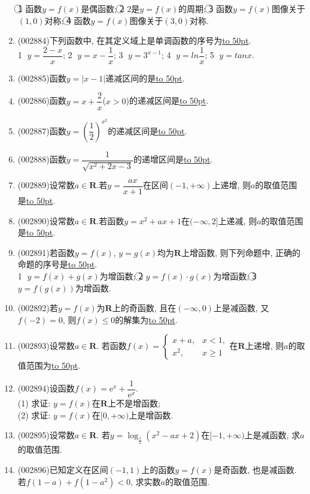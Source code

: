 \documentclass[10pt,a4paper]{article}
\newcommand{\blank}[1]{\underline{\hbox to #1pt{}}}
\begin{document}
\begin{enumerate}[1.]
\textcircled{1} 函数$y=f(x)$是偶函数; \textcircled{2} $2$是$y=f(x)$的周期; \textcircled{3} 函数$y=f(x)$图像关于$(1,0)$对称; \textcircled{4} 函数$y=f(x)$图像关于$(3,0)$对称.
\item {\tiny (002884)}下列函数中, 在其定义域上是单调函数的序号为\blank{50}.\\
\textcircled{1} $y=\dfrac{2-x}x$; \textcircled{2} $y=x-\dfrac 1x$; \textcircled{3} $y={3^{x-1}}$; \textcircled{4} $y=ln\dfrac 1x$; \textcircled{5} $y=tanx$.
\item {\tiny (002885)}函数$y=|x-1|$递减区间的是\blank{50}.
\item {\tiny (002886)}函数$y=x+\dfrac 2x$($x>0$)的递减区间是\blank{50}.
\item {\tiny (002887)}函数$y=(\dfrac 12)^{x^2}$的递减区间是\blank{50}.
\item {\tiny (002888)}函数$y=\dfrac 1{\sqrt{x^2+2x-3}}$的递增区间是\blank{50}.
\item {\tiny (002889)}设常数$a\in \mathbf{R}$.若$y=\dfrac{ax}{x+1}$在区间$(-1,+\infty)$上递增, 则$a$的取值范围是\blank{50}.
\item {\tiny (002890)}设常数$a\in \mathbf{R}$.若函数$y=x^2+ax+1$在$(-\infty,2]$上递减, 则$a$的取值范围是\blank{50}.
\item {\tiny (002891)}若函数$y=f(x)$, $y=g(x)$均为$\mathbf{R}$上增函数, 则下列命题中, 正确的命题的序号是\blank{50}.\\
\textcircled{1} $y=f(x)+g(x)$为增函数; \textcircled{2} $y=f(x)\cdot g(x)$为增函数; \textcircled{3} $y=f(g(x))$为增函数.
\item {\tiny (002892)}若$y=f(x)$为$\mathbf{R}$上的奇函数, 且在$(-\infty,0)$上是减函数, 又$f(-2)=0$, 则$f(x)\le 0$的解集为\blank{50}.
\item {\tiny (002893)}设常数$a\in \mathbf{R}$. 若函数$f(x)=\begin{cases} x+a,& x<1, \\ x^2,& x\ge 1 \end{cases}$在$\mathbf{R}$上递增, 则$a$的取值范围为\blank{50}.
\item {\tiny (002894)}设函数$f(x)=\mathrm{e}^x+\dfrac 1{\mathrm{e}^x}$.\\
(1) 求证: $y=f(x)$在$\mathbf{R}$上不是增函数;\\
(2) 求证: $y=f(x)$在$[0,+\infty)$上是增函数.
\item {\tiny (002895)}设常数$a\in \mathbf{R}$. 若$y=\log_{\frac 12}(x^2-ax+2)$在$[-1,+\infty)$上是减函数, 求$a$的取值范围.
\item {\tiny (002896)}已知定义在区间$(-1,1)$上的函数$y=f(x)$是奇函数, 也是减函数. 若$f(1-a)+f(1-a^2)<0$, 求实数$a$的取值范围.

\end{enumerate}
\end{document}
